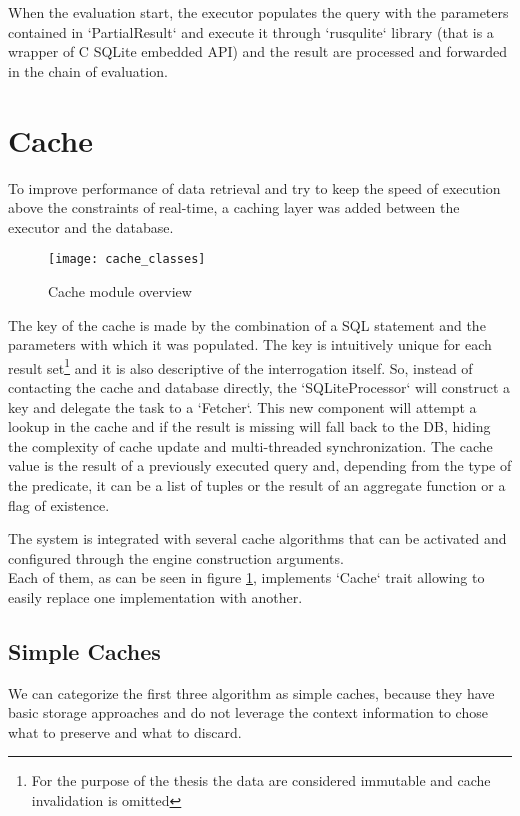 When the evaluation start, the executor populates the query with the parameters contained in `PartialResult` and execute it through `rusqulite` library (that is a wrapper of C SQLite embedded API) and the result are processed and forwarded in the chain of evaluation.

\section{Cache}
\label{sec:cache-impl}
To improve performance of data retrieval and try to keep the speed of execution above the constraints of real-time, a caching layer was added between the executor and the database.
\begin{figure}[h]
  \centering
  \texttt{[image: cache\_classes]}
  \caption{Cache module overview}
  \label{fig:cache_classes}
\end{figure}

The key of the cache is made by the combination of a SQL statement and the parameters with which it was populated. The key is intuitively unique for each result set\footnote{For the purpose of the thesis the data are considered immutable and cache invalidation is omitted} and it is also descriptive of the interrogation itself. So, instead of contacting the cache and database directly, the `SQLiteProcessor` will construct a key and delegate the task to a `Fetcher`. This new component will attempt a lookup in the cache and if the result is missing will fall back to the DB, hiding the complexity of cache update and multi-threaded synchronization.
The cache value is the result of a previously executed query and, depending from the type of the predicate, it can be a list of tuples or the result of an aggregate function or a flag of existence.

The system is integrated with several cache algorithms that can be activated and configured through the engine construction arguments.\\
Each of them, as can be seen in figure \ref{fig:cache_classes}, implements `Cache` trait allowing to easily replace one implementation with another.\\

\subsection{Simple Caches}
We can categorize the first three algorithm as simple caches, because they have basic storage approaches and do not leverage the context information to chose what to preserve and what to discard.
